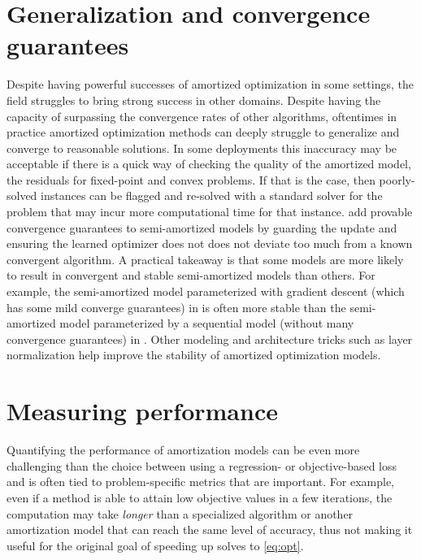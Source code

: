 \section{Generalization and convergence guarantees}
\label{sec:generalization}
Despite having powerful successes of amortized optimization in
some settings, the field struggles to bring strong success
in other domains.
Despite having the capacity of surpassing the convergence rates of
other algorithms, oftentimes in practice amortized optimization
methods can deeply struggle to generalize and converge to
reasonable solutions.
In some deployments this inaccuracy may be acceptable if there
is a quick way of checking the quality of the amortized model,
\eg the residuals for fixed-point and convex problems.
If that is the case, then poorly-solved instances can be flagged
and re-solved with a standard solver for the problem that
may incur more computational time for that instance.
\citet{banert2021accelerated,premont2022simple} add provable
convergence guarantees to semi-amortized models by guarding
the update and ensuring the learned optimizer does not
does not deviate too much from a known convergent algorithm.
A practical takeaway is that some models are more likely
to result in convergent and stable semi-amortized models
than others.
For example, the semi-amortized model
parameterized with gradient descent (which
has some mild converge guarantees) in \citet{finn2017model}
is often more stable than the semi-amortized model parameterized
by a sequential model (without many convergence guarantees)
in \citep{ravi2016optimization}.
Other modeling and architecture tricks such as layer
normalization \citep{ba2016layernorm} help improve the
stability of amortized optimization models.

\section{Measuring performance}
Quantifying the performance of amortization models can be even more
challenging than the choice between using a regression- or
objective-based loss and is often tied to
problem-specific metrics that are important.
For example, even if a method is able to attain low objective values
in a few iterations, the computation may take \emph{longer} than
a specialized algorithm or another amortization model that can reach
the same level of accuracy, thus not making it useful for the
original goal of speeding up solves to \cref{eq:opt}.

